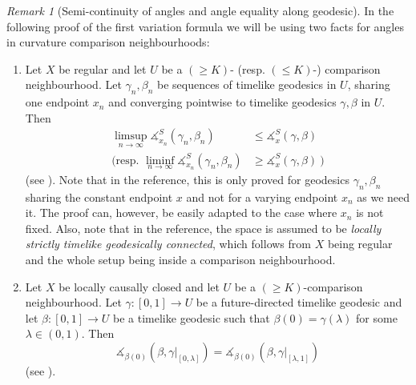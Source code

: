 \documentclass[11pt,reqno]{amsart}
\theoremstyle{definition}
\theoremstyle{definition}
\theoremstyle{plain}
\theoremstyle{remark}
\newtheorem{rem}[dfn]{Remark}
\newcommand{\ma}{\measuredangle}
\begin{document}
\begin{rem}[Semi-continuity of angles and angle equality along geodesic]
\label{rem:CBBfact}
    In the following proof of the first variation formula we will be using two facts for angles in curvature comparison neighbourhoods:
    \begin{enumerate}[label=(\roman*)]
        \item Let $X$ be regular and let $U$ be a $(\geq K)$- (resp. $(\leq K)$-) comparison neighbourhood. Let $\gamma_n,\beta_n$ be sequences of timelike geodesics in $U$, sharing one endpoint $x_n$ and converging pointwise to timelike geodesics $\gamma,\beta$ in $U$. Then
        \begin{equation*}
        \begin{split}
            \limsup_{n\to\infty}\ma^S_{x_n}(\gamma_n,\beta_n)&\leq\ma_x^S(\gamma,\beta)\\
            (\text{resp. }\liminf_{n\to\infty}\ma_{x_n}^S(\gamma_n,\beta_n)&\geq\ma_x^S(\gamma,\beta)\ )
        \end{split}
        \end{equation*}
        (see \cite[Prop. 4.14]{beran-saemann2023}). Note that in the reference, this is only proved for geodesics $\gamma_n,\beta_n$ sharing the constant endpoint $x$ and not for a varying endpoint $x_n$ as we need it. The proof can, however, be easily adapted to the case where $x_n$ is not fixed. Also, note that in the reference, the space is assumed to be \emph{locally strictly timelike geodesically connected}, which follows from $X$ being regular and the whole setup being inside a comparison neighbourhood. \label{CBBfact1}
        \item Let $X$ be locally causally closed and let $U$ be a $(\geq K)$-comparison neighbourhood. Let $\gamma:[0,1]\to U$ be a future-directed timelike geodesic and let $\beta:[0,1]\to U$ be a timelike geodesic such that $\beta(0)=\gamma(\lambda)$ for some $\lambda\in(0,1)$. Then 
        \begin{equation*}
            \ma_{\beta(0)}(\beta,\gamma\big|_{[0,\lambda]})=\ma_{\beta(0)}(\beta,\gamma\big|_{[\lambda,1]})
        \end{equation*}
        (see \cite[Cor. 4.7]{beran-saemann2023}). \label{CBBfact2}
    \end{enumerate}
\end{rem}
\end{document}
